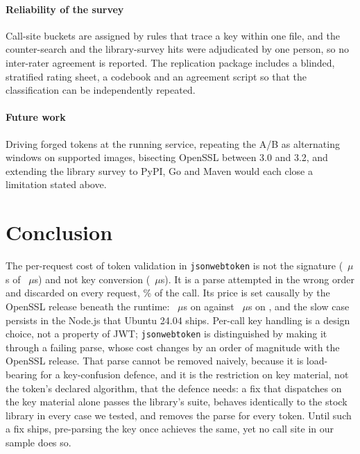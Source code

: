 \documentclass[preprint,12pt,authoryear]{elsarticle}
\newcommand{\LibraryName}{\texttt{jsonwebtoken}}
\begin{document}
\paragraph{Reliability of the survey} Call-site buckets are assigned by rules
that trace a key within one file, and the counter-search and the library-survey
hits were adjudicated by one person, so no inter-rater agreement is reported.
The replication package includes a blinded, stratified rating sheet, a codebook
and an agreement script so that the classification can be independently
repeated.

\paragraph{Future work} Driving forged tokens at the running service, repeating
the A/B as alternating windows on supported images, bisecting OpenSSL between
3.0 and 3.2, and extending the library survey to PyPI, Go and Maven would each
close a limitation stated above.

\section{Conclusion}\label{sec:conclusion}

The per-request cost of token validation in \LibraryName{} is not the
signature (\HostHmacString~$\mu$s of \HostJwtString~$\mu$s) and not key
conversion (\HostCreateSecretKey~$\mu$s). It is a parse attempted in the wrong
order and discarded on every request, \HostProbeShareOfCall\% of the call. Its
price is set causally by the OpenSSL release beneath the runtime:
\CFullVThreeZeroSixteen~$\mu$s on \CVersionLiteralVThreeZeroSixteen{} against
\CFullVThreeFiveEight~$\mu$s on \CVersionLiteralVThreeFiveEight, and the slow
case persists in the Node.js that Ubuntu 24.04 ships. Per-call key handling is
a design choice, not a property of JWT; \LibraryName{} is distinguished by
making it through a failing parse, whose cost changes by an order of magnitude
with the OpenSSL release. That
parse cannot be removed naively, because it is load-bearing for a key-confusion
defence, and it is the restriction on key material, not the token's declared
algorithm, that the defence needs: a fix that dispatches on the key material
alone passes the library's suite, behaves identically to the stock library in
every case we tested, and removes the parse for every token. Until such a fix
ships, pre-parsing the key once achieves the same, yet no call site in our
sample does so.
\end{document}
